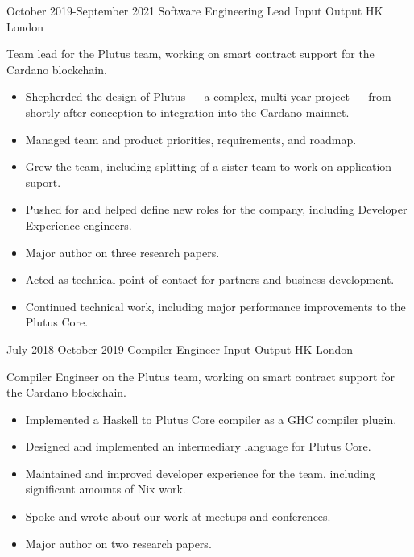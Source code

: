 \documentclass[12pt,a4paper,sans]{moderncv}
\begin{document}
\cventry
{October 2019-September 2021}
{Software Engineering Lead}
{Input Output HK}
{London}
{}
{
  Team lead for the Plutus team, working on smart contract support for the Cardano blockchain.
  \begin{itemize}
    \item Shepherded the design of Plutus --- a  complex, multi-year project --- from shortly after conception to integration into the Cardano mainnet.
    \item Managed team and product priorities, requirements, and roadmap.
    \item Grew the team, including splitting of a sister team to work on application suport.
    \item Pushed for and helped define new roles for the company, including Developer Experience engineers.
    \item Major author on three research papers.
    \item Acted as technical point of contact for partners and business development.
    \item Continued technical work, including major performance improvements to the Plutus Core.
  \end{itemize}
}

\cventry
{July 2018-October 2019}
{Compiler Engineer}
{Input Output HK}
{London}
{}
{
  Compiler Engineer on the Plutus team, working on smart contract support for the Cardano blockchain.
  \begin{itemize}
    \item Implemented a Haskell to Plutus Core compiler as a GHC compiler plugin.
    \item Designed and implemented an intermediary language for Plutus Core.
    \item Maintained and improved developer experience for the team, including significant amounts of Nix work.
    \item Spoke and wrote about our work at meetups and conferences.
    \item Major author on two research papers.
  \end{itemize}
}
\end{document}
